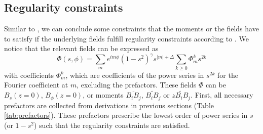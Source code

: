 \subsection{Regularity constraints}

Similar to \textcite{holdenried-chernoff_long_2021}, we can conclude some constraints that the moments or the fields have to satisfy if the underlying fields fulfill regularity constraints according to \textcite{lewis_physical_1990}. We notice that the relevant fields can be expressed as
\[
\Phi(s, \phi) = \sum_m e^{im\phi} \left(1-s^2\right)^\gamma s^{|m|+\Delta} \sum_{k\geq 0} \Phi_m^k s^{2k}
\]
with coefficients $\Phi_m^k$, which are coefficients of the power series in $s^{2k}$ for the Fourier coefficient at $m$, excluding the prefactors. These fields $\Phi$ can be $B_s(z = 0)$, $B_\phi(z=0)$, or moments $\overline{B_i B_j}$, $\widetilde{B_i B_j}$ or $\widetilde{z B_i B_j}$. First, all necessary prefactors are collected from derivations in previous sections (Table \ref{tab:prefactors}). These prefactors prescribe the lowest order of power series in $s$ (or $1-s^2$) such that the regularity constraints are satisfied.

